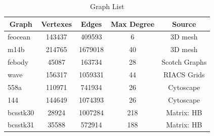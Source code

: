 \documentclass[12pt,glossary]{dalthesis}
\begin{document}
\begin{table}[ht]
\centering
\caption{Graph List}
\label{graph-list}
\begin{tabular}{|l||c|c|c|c|}
\hline
\multicolumn{1}{|c||}{Graph} & Vertexes & Edges   & Max Degree & Source        \\ \hline
feocean                   & 143437   & 409593  & 6          & 3D mesh       \\
m14b                      & 214765   & 1679018 & 40         & 3D mesh       \\
febody                    & 45087    & 163734  & 28         & Scotch Graphs \\ 
wave                      & 156317   & 1059331 & 44         & RIACS Grids   \\
558a                      & 110971   & 741934  & 26         & Cytoscape     \\
144                       & 144649   & 1074393 & 26         & Cytoscape     \\
bcsstk30                  & 28924    & 1007284 & 218        & Matrix: HB    \\
bcsstk31                  & 35588    & 572914  & 188        & Matrix: HB    \\ \hline
\end{tabular}
\end{table}
\end{document}
